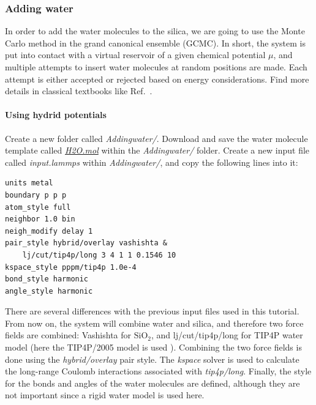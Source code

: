 \documentclass[9pt,tutorial]{livecoms}
\begin{document}
\subsubsection{Adding water}
\noindent In order to add the water molecules to the silica, we are going to use the Monte Carlo method in the grand canonical ensemble (GCMC). In short, the system is put into contact with a virtual reservoir of a given chemical potential $\mu$, and multiple attempts to insert water molecules at random positions are made. Each attempt is either accepted or rejected based on energy considerations. Find more details in classical textbooks like Ref.~.

\paragraph{Using hydrid potentials}
\noindent Create a new folder called \textit{Addingwater/}. Download and save the water molecule template called \href{https://raw.githubusercontent.com/lammpstutorials/lammpstutorials-article/main/files/tutorial6/H2O.mol}{\textit{H2O.mol}} within the \textit{Addingwater/} folder. Create a new input file called \textit{input.lammps} within \textit{Addingwater/}, and copy the following lines into it:
{\normalsize \begin{verbatim}
units metal
boundary p p p
atom_style full
neighbor 1.0 bin
neigh_modify delay 1
pair_style hybrid/overlay vashishta &
    lj/cut/tip4p/long 3 4 1 1 0.1546 10
kspace_style pppm/tip4p 1.0e-4
bond_style harmonic
angle_style harmonic
\end{verbatim}}
There are several differences with the previous input files used in this tutorial. From now on, the system will combine water and silica, and therefore two force fields are combined: Vashishta for $\text{SiO}_2$, and lj/cut/tip4p/long for TIP4P water model (here
the TIP4P/2005 model is used \cite{abascal2005general}). Combining the two force fields is done using the \textit{hybrid/overlay} pair style. The \textit{kspace} solver is used to calculate the long-range Coulomb interactions associated with \textit{tip4p/long}. Finally, the style for the bonds and angles of the water molecules are defined, although they are not important since a rigid water model is used here.
\end{document}

